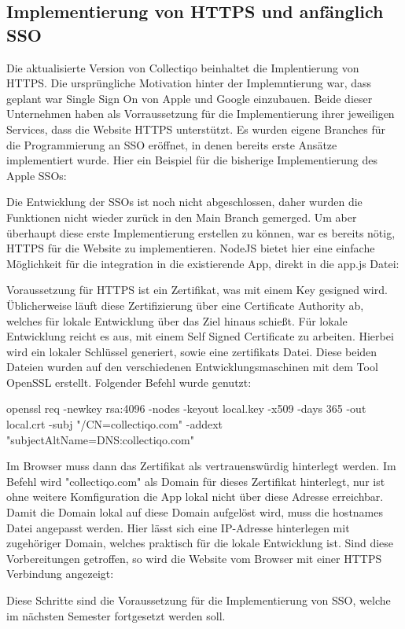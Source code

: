 \subsection{Implementierung von HTTPS und anfänglich SSO}\label{subsec:implementierung-von-https}

Die aktualisierte Version von Collectiqo beinhaltet die Implentierung von HTTPS.
Die ursprüngliche Motivation hinter der Implemntierung war, dass geplant war Single Sign On von Apple und Google einzubauen.
Beide dieser Unternehmen haben als Vorraussetzung für die Implementierung ihrer jeweiligen Services, dass die Website HTTPS unterstützt.
Es wurden eigene Branches für die Programmierung an SSO eröffnet, in denen bereits erste Ansätze implementiert wurde.
Hier ein Beispiel für die bisherige Implementierung des Apple SSOs:


Die Entwicklung der SSOs ist noch nicht abgeschlossen, daher wurden die Funktionen nicht wieder zurück in den Main Branch gemerged.
Um aber überhaupt diese erste Implementierung erstellen zu können, war es bereits nötig, HTTPS für die Website zu implementieren.
NodeJS bietet hier eine einfache Möglichkeit für die integration in die existierende App, direkt in die app.js Datei:


Voraussetzung für HTTPS ist ein Zertifikat, was mit einem Key gesigned wird.
Üblicherweise läuft diese Zertifizierung über eine Certificate Authority ab, welches für lokale Entwicklung über das Ziel hinaus schießt.
Für lokale Entwicklung reicht es aus, mit einem Self Signed Certificate zu arbeiten.
Hierbei wird ein lokaler Schlüssel generiert, sowie eine zertifikats Datei.
Diese beiden Dateien wurden auf den verschiedenen Entwicklungsmaschinen mit dem Tool OpenSSL erstellt.
Folgender Befehl wurde genutzt:

openssl req -newkey rsa:4096 -nodes -keyout local.key -x509 -days 365 -out local.crt -subj "/CN=collectiqo.com" -addext "subjectAltName=DNS:collectiqo.com"

Im Browser muss dann das Zertifikat als vertrauenswürdig hinterlegt werden.
Im Befehl wird "collectiqo.com" als Domain für dieses Zertifikat hinterlegt, nur ist ohne weitere Komfiguration die App lokal nicht über diese Adresse erreichbar.
Damit die Domain lokal auf diese Domain aufgelöst wird, muss die hostnames Datei angepasst werden.
Hier lässt sich eine IP-Adresse hinterlegen mit zugehöriger Domain, welches praktisch für die lokale Entwicklung ist.
Sind diese Vorbereitungen getroffen, so wird die Website vom Browser mit einer HTTPS Verbindung angezeigt:


Diese Schritte sind die Voraussetzung für die Implementierung von SSO, welche im nächsten Semester fortgesetzt werden soll.